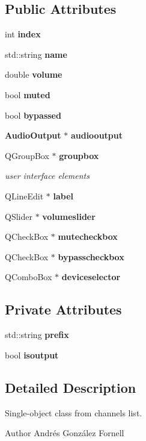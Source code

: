 \subsection*{Public Attributes}
\begin{DoxyCompactItemize}
\item 
int \textbf{ index}
\item 
std\+::string \textbf{ name}
\item 
double \textbf{ volume}
\item 
bool \textbf{ muted}
\item 
bool \textbf{ bypassed}
\item 
\textbf{ Audio\+Output} $\ast$ \textbf{ audiooutput}
\end{DoxyCompactItemize}
\textbf{ }\par
\begin{DoxyCompactItemize}
\item 
Q\+Group\+Box $\ast$ \textbf{ groupbox}
\begin{DoxyCompactList}\small\item\em user interface elements \end{DoxyCompactList}\item 
Q\+Line\+Edit $\ast$ \textbf{ label}
\item 
Q\+Slider $\ast$ \textbf{ volumeslider}
\item 
Q\+Check\+Box $\ast$ \textbf{ mutecheckbox}
\item 
Q\+Check\+Box $\ast$ \textbf{ bypasscheckbox}
\item 
Q\+Combo\+Box $\ast$ \textbf{ deviceselector}
\end{DoxyCompactItemize}

\subsection*{Private Attributes}
\begin{DoxyCompactItemize}
\item 
std\+::string \textbf{ prefix}
\item 
bool \textbf{ isoutput}
\end{DoxyCompactItemize}


\subsection{Detailed Description}
Single-\/object class from channels list. 

\begin{DoxyAuthor}{Author}
Andrés González Fornell 
\end{DoxyAuthor}



